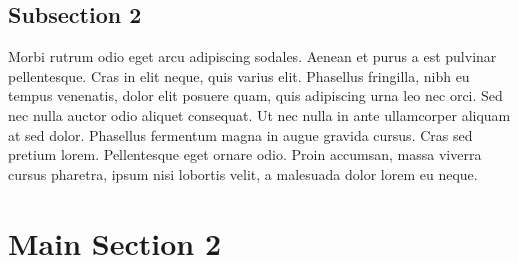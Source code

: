 \subsection{Subsection 2}
Morbi rutrum odio eget arcu adipiscing sodales. Aenean et purus a est pulvinar pellentesque. Cras in elit neque, quis varius elit. Phasellus fringilla, nibh eu tempus venenatis, dolor elit posuere quam, quis adipiscing urna leo nec orci. Sed nec nulla auctor odio aliquet consequat. Ut nec nulla in ante ullamcorper aliquam at sed dolor. Phasellus fermentum magna in augue gravida cursus. Cras sed pretium lorem. Pellentesque eget ornare odio. Proin accumsan, massa viverra cursus pharetra, ipsum nisi lobortis velit, a malesuada dolor lorem eu neque.


\section{Main Section 2}

